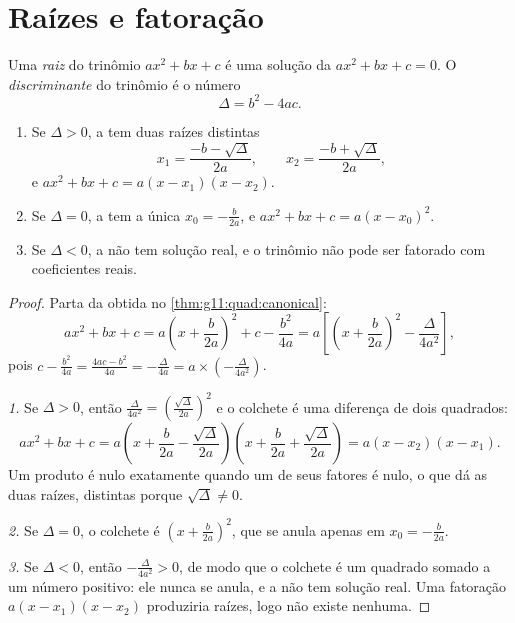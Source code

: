 \section{Raízes e fatoração}

\begin{definition}\label{def:g11:quad:discriminant}
Uma \emph{raiz} do trinômio $ax^2+bx+c$ é uma solução da
 $ax^2 + bx + c = 0$. O
\emph{discriminante} do trinômio é o número
\[
\Delta = b^2 - 4ac .
\]
\end{definition}

\begin{theorem}[Resolução de $ax^2+bx+c=0$]\label{thm:g11:quad:roots}
\begin{enumerate}
  \item Se $\Delta > 0$, a  tem duas raízes distintas
        \[
        x_1 = \frac{-b - \sqrt{\Delta}}{2a},
        \qquad
        x_2 = \frac{-b + \sqrt{\Delta}}{2a},
        \]
        e $ax^2+bx+c = a(x - x_1)(x - x_2)$.
  \item Se $\Delta = 0$, a  tem a única 
        $x_0 = -\frac{b}{2a}$, e $ax^2+bx+c = a(x - x_0)^2$.
  \item Se $\Delta < 0$, a  não tem solução real, e o trinômio não
        pode ser fatorado com coeficientes reais.
\end{enumerate}
\end{theorem}

\begin{proof}
Parta da  obtida no \cref{thm:g11:quad:canonical}:
\[
ax^2+bx+c
= a\left(x + \frac{b}{2a}\right)^2 + c - \frac{b^2}{4a}
= a\left[\left(x + \frac{b}{2a}\right)^2 - \frac{\Delta}{4a^2}\right],
\]
pois $c - \frac{b^2}{4a} = \frac{4ac - b^2}{4a} = -\frac{\Delta}{4a} =
a \times \left(-\frac{\Delta}{4a^2}\right)$.

\emph{1.} Se $\Delta > 0$, então $\frac{\Delta}{4a^2} =
\left(\frac{\sqrt\Delta}{2a}\right)^2$ e o colchete é uma diferença de
dois quadrados:
\[
ax^2+bx+c = a\left(x + \frac{b}{2a} - \frac{\sqrt\Delta}{2a}\right)
\left(x + \frac{b}{2a} + \frac{\sqrt\Delta}{2a}\right)
= a(x - x_2)(x - x_1).
\]
Um produto é nulo exatamente quando um de seus fatores é nulo, o que dá
as duas raízes, distintas porque $\sqrt\Delta \neq 0$.

\emph{2.} Se $\Delta = 0$, o colchete é
$\left(x + \frac{b}{2a}\right)^2$, que se anula apenas em
$x_0 = -\frac{b}{2a}$.

\emph{3.} Se $\Delta < 0$, então $-\frac{\Delta}{4a^2} > 0$, de modo que
o colchete é um quadrado somado a um número positivo: ele nunca se anula,
e a  não tem solução real. Uma fatoração $a(x-x_1)(x-x_2)$
produziria raízes, logo não existe nenhuma.
\end{proof}

